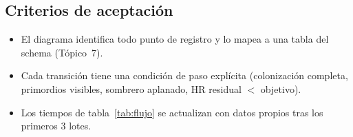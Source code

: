 \subsection{Criterios de aceptación}
\label{sec:flujo:aceptacion}

\begin{itemize}[leftmargin=*,itemsep=0pt]
  \item El diagrama identifica todo punto de registro y lo mapea a una
        tabla del schema (Tópico~7).
  \item Cada transición tiene una condición de paso explícita
        (colonización completa, primordios visibles, sombrero
        aplanado, HR residual $<$ objetivo).
  \item Los tiempos de tabla~\ref{tab:flujo} se actualizan con datos
        propios tras los primeros 3 lotes.
\end{itemize}
